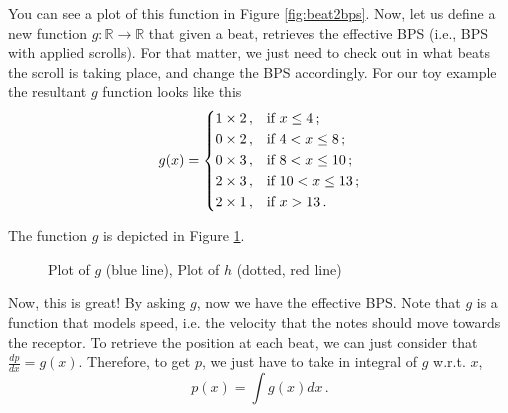 \documentclass[a4paper,9pt]{article}
\begin{document}
    You can see a plot of this function in Figure  \ref{fig:beat2bps}. Now, let us define a new function $g: \mathbb{R}\rightarrow \mathbb{R}$ that given a beat, retrieves the effective BPS (i.e., BPS with applied scrolls). For that matter, we just need to check out in what beats the scroll is taking place, and change the BPS accordingly. For our toy example the resultant $g$ function looks like this
    \begin{equation}
	    g(x) = \begin{dcases}
		    1\times 2\,, & \text{if $x \leq 4\,;$}\\ 
		    0\times 2\,, & \text{if $4 < x \leq 8\,;$}\\ 
		    0\times 3\,, & \text{if $8 < x \leq 10\,;$}\\ 
		    2\times 3\,, & \text{if $10 < x \leq 13\,;$}\\ 
		    2\times 1 \,, & \text{if $x > 13\,.$}\\ 
	    \end{dcases}
	    \label{eq:beat2effective-bps}
    \end{equation}

    The function $g$ is depicted in Figure \ref{fig:beat2effective-bps}.
\begin{figure}[htpb]
	\centering

\caption{Plot of $g$ (blue line), Plot of $h$ (dotted, red line)}
	\label{fig:beat2effective-bps}
\end{figure}
Now, this is great! By asking $g$, now we have the effective BPS. Note that $g$ is a function that models speed, i.e. the velocity that the notes should move towards the receptor.
To retrieve the position at each beat, we can just consider that $\frac{dp}{dx} = g(x)$. Therefore, to get $p$, we just have to take in integral of $g$ w.r.t. $x$,
\begin{equation}
p(x) = \int g(x) dx\,.
	\label{eq:beat2position}
\end{equation}
\end{document}
